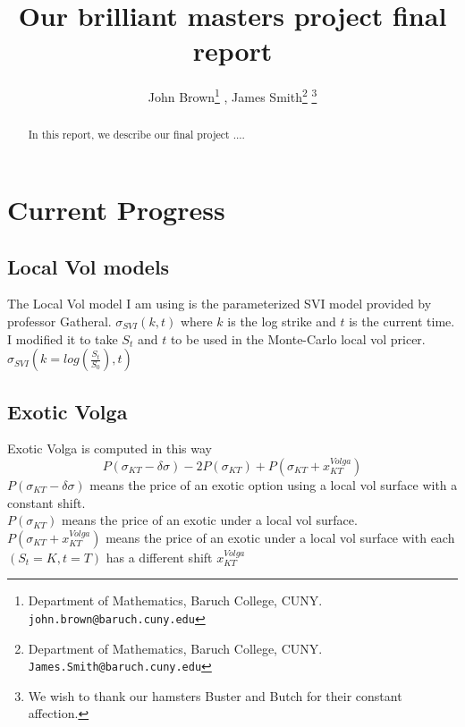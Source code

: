 \documentclass[12pt]{article}
\numberwithin{equation}{section}
\begin{document}
\title{\bf Our brilliant masters project final report}

\author{John Brown\footnote{Department of Mathematics, Baruch College, CUNY. {\tt  john.brown@baruch.cuny.edu}}{\setcounter{footnote}{1}} , James Smith\footnote{Department of Mathematics, Baruch College, CUNY. {\tt  James.Smith@baruch.cuny.edu}}{\setcounter{footnote}{2}} \thanks{We wish to thank our hamsters Buster and Butch for their constant affection.}
}



\maketitle\thispagestyle{empty}
 



\begin{abstract}
In this report, we describe our final project ....
\end{abstract}

%
%
%
%

\section{Current Progress}
\subsection{Local Vol models}
The Local Vol model I am using is the parameterized SVI model provided by professor Gatheral.
$\sigma_{SVI}(k,t)$ where $k$ is the log strike and $t$ is the current time. I modified it to take $S_t$ and $t$ to be used in the Monte-Carlo local vol pricer.
$\sigma_{SVI}(k=log(\frac{S_t}{S_0}),t)$

\subsection{Exotic Volga}
Exotic Volga is computed in this way
\[
    P(\sigma_{KT}-\delta \sigma)-2P(\sigma_{KT})+P(\sigma_{KT}+x_{KT}^{Volga})
\]
$P(\sigma_{KT}-\delta \sigma)$ means the price of an exotic option using a local vol surface with a constant shift.\\
$P(\sigma_{KT})$ means the price of an exotic under a local vol surface.\\
$P(\sigma_{KT}+x_{KT}^{Volga})$ means the price of an exotic under a local vol surface with each $(S_t=K,t=T)$ has a different shift $x_{KT}^{Volga}$\\
\end{document}
